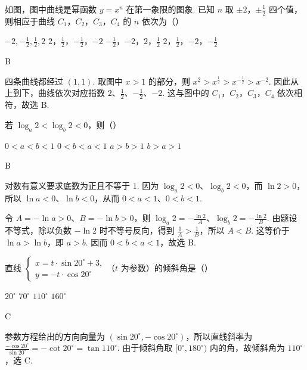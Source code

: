 \documentclass[UTF8,a4paper,oneside,11pt]{ctexbook}
\begin{document}
\begin{problem}
如图，图中曲线是幂函数 \(y=x^n\) 在第一象限的图象. 已知 \(n\) 取 \(\pm 2\)，\(\pm \frac{1}{2}\) 四个值，则相应于曲线 \(C_1\)，\(C_2\)，\(C_3\)，\(C_4\) 的 \(n\) 依次为（\quad）


\choices
    {\(-2, -\frac{1}{2}, \frac{1}{2}, 2\)}
    {\(2\)，\(\frac{1}{2}\)，\(-\frac{1}{2}\)，\(-2\)}
    {\(-\frac{1}{2}\)，\(-2\)，\(2\)，\(\frac{1}{2}\)}
    {\(2\)，\(\frac{1}{2}\)，\(-2\)，\(-\frac{1}{2}\)}

\begin{answer}
B
\end{answer}

\begin{solution}
四条曲线都经过 \((1,1)\). 取图中 \(x>1\) 的部分，则
\(x^2>x^{\frac{1}{2}}>x^{-\frac{1}{2}}>x^{-2}\). 因此从上到下，曲线依次对应指数 \(2\)、\(\frac12\)、\(-\frac12\)、\(-2\). 这与图中的 \(C_1\)，\(C_2\)，\(C_3\)，\(C_4\) 依次相符，故选 B.
\end{solution}
\end{problem}

\begin{problem}
若 \(\log_a 2<\log_b 2<0\)，则（\quad）

\choices
    {\(0<a<b<1\)}
    {\(0<b<a<1\)}
    {\(a>b>1\)}
    {\(b>a>1\)}

\begin{answer}
B
\end{answer}

\begin{solution}
对数有意义要求底数为正且不等于 \(1\). 因为 \(\log_a2<0\)、\(\log_b2<0\)，而 \(\ln2>0\)，所以 \(\ln a<0\)、\(\ln b<0\)，从而 \(0<a<1\)、\(0<b<1\).

令 \(A=-\ln a>0\)、\(B=-\ln b>0\)，则
\(\log_a2=-\frac{\ln2}{A}\)、\(\log_b2=-\frac{\ln2}{B}\). 由题设不等式，除以负数 \(-\ln2\) 时不等号反向，得到 \(\frac1A>\frac1B\)，所以 \(A<B\). 这等价于 \(\ln a>\ln b\)，即 \(a>b\). 因而 \(0<b<a<1\)，故选 B.
\end{solution}
\end{problem}

\begin{problem}
直线 \(\begin{cases}
x=t\cdot \sin 20^{\circ}+3,\\
y=-t\cdot \cos 20^{\circ}
\end{cases}\)（\(t\) 为参数）的倾斜角是（\quad）

\choices
    {\(20^{\circ}\)}
    {\(70^{\circ}\)}
    {\(110^{\circ}\)}
    {\(160^{\circ}\)}

\begin{answer}
C
\end{answer}

\begin{solution}
参数方程给出的方向向量为 \(\left(\sin20^{\circ},-\cos20^{\circ}\right)\)，所以直线斜率为
\(\frac{-\cos20^{\circ}}{\sin20^{\circ}}=-\cot20^{\circ}=\tan110^{\circ}\). 由于倾斜角取 \([0^{\circ},180^{\circ})\) 内的角，故倾斜角为 \(110^{\circ}\)，选 C.
\end{solution}
\end{problem}
\end{document}
